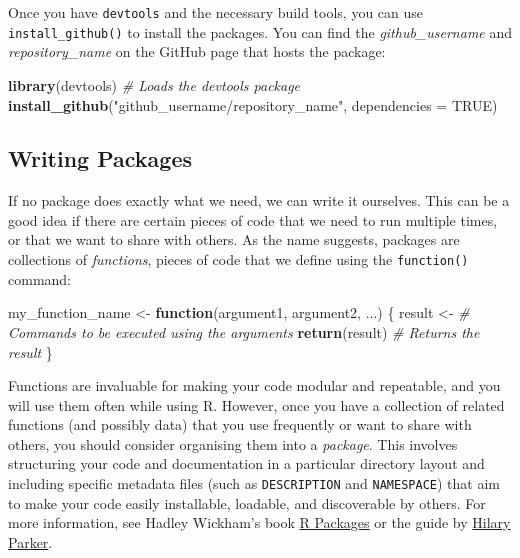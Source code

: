 \documentclass[
]{book}
\newenvironment{Shaded}{\begin{snugshade}}{\end{snugshade}}
\newcommand{\AttributeTok}[1]{\textcolor[rgb]{0.13,0.29,0.53}{#1}}
\newcommand{\CommentTok}[1]{\textcolor[rgb]{0.56,0.35,0.01}{\textit{#1}}}
\newcommand{\ConstantTok}[1]{\textcolor[rgb]{0.56,0.35,0.01}{#1}}
\newcommand{\ControlFlowTok}[1]{\textcolor[rgb]{0.13,0.29,0.53}{\textbf{#1}}}
\newcommand{\FunctionTok}[1]{\textcolor[rgb]{0.13,0.29,0.53}{\textbf{#1}}}
\newcommand{\NormalTok}[1]{#1}
\newcommand{\OtherTok}[1]{\textcolor[rgb]{0.56,0.35,0.01}{#1}}
\newcommand{\StringTok}[1]{\textcolor[rgb]{0.31,0.60,0.02}{#1}}
\begin{document}
Once you have \texttt{devtools} and the necessary build tools, you can use \texttt{install\_github()} to install the packages. You can find the \emph{github\_username} and \emph{repository\_name} on the GitHub page that hosts the package:

\begin{Shaded}
\begin{Highlighting}[]
\FunctionTok{library}\NormalTok{(devtools) }\CommentTok{\# Loads the devtools package}
\FunctionTok{install\_github}\NormalTok{(}\StringTok{"github\_username/repository\_name"}\NormalTok{, }\AttributeTok{dependencies =} \ConstantTok{TRUE}\NormalTok{)}
\end{Highlighting}
\end{Shaded}

\subsection{Writing Packages}\label{writing-packages}

If no package does exactly what we need, we can write it ourselves. This can be a good idea if there are certain pieces of code that we need to run multiple times, or that we want to share with others. As the name suggests, packages are collections of \emph{functions}, pieces of code that we define using the \texttt{function()} command:

\begin{Shaded}
\begin{Highlighting}[]
\NormalTok{my\_function\_name }\OtherTok{\textless{}{-}} \ControlFlowTok{function}\NormalTok{(argument1, argument2, ...) \{}
\NormalTok{  result }\OtherTok{\textless{}{-}} \CommentTok{\# Commands to be executed using the arguments}
  \FunctionTok{return}\NormalTok{(result)   }\CommentTok{\# Returns the result}
\NormalTok{\}}
\end{Highlighting}
\end{Shaded}

Functions are invaluable for making your code modular and repeatable, and you will use them often while using R. However, once you have a collection of related functions (and possibly data) that you use frequently or want to share with others, you should consider organising them into a \emph{package}. This involves structuring your code and documentation in a particular directory layout and including specific metadata files (such as \texttt{DESCRIPTION} and \texttt{NAMESPACE}) that aim to make your code easily installable, loadable, and discoverable by others. For more information, see Hadley Wickham's book \href{https://r-pkgs.org/}{R Packages} or the guide by \href{https://hilaryparker.com/2014/04/29/writing-an-r-package-from-scratch/}{Hilary Parker}.
\end{document}
